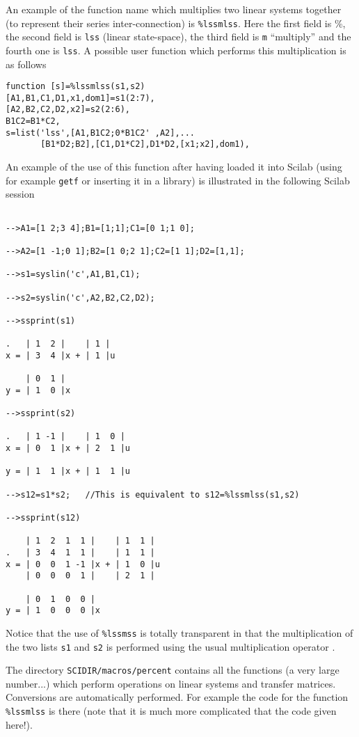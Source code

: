 	An example of the function name which multiplies two
linear systems together (to represent their series inter-connection)
is {\tt \%lssmlss}.  Here the first field is \%, the second field is 
{\tt lss} (linear state-space), the third field is {\tt m} ``multiply''
and the fourth one is {\tt lss}. A possible user function which performs
this multiplication is as follows
\begin{verbatim}
function [s]=%lssmlss(s1,s2)
[A1,B1,C1,D1,x1,dom1]=s1(2:7),
[A2,B2,C2,D2,x2]=s2(2:6),
B1C2=B1*C2,
s=list('lss',[A1,B1C2;0*B1C2' ,A2],...
       [B1*D2;B2],[C1,D1*C2],D1*D2,[x1;x2],dom1),
\end{verbatim}
An example of the use of this function after having loaded it into
Scilab (using for example {\tt getf} or inserting it in a library) 
is illustrated in the following Scilab session
\begin{verbatim}
 
-->A1=[1 2;3 4];B1=[1;1];C1=[0 1;1 0];
 
-->A2=[1 -1;0 1];B2=[1 0;2 1];C2=[1 1];D2=[1,1];
 
-->s1=syslin('c',A1,B1,C1);
 
-->s2=syslin('c',A2,B2,C2,D2);
 
-->ssprint(s1)
 
.   | 1  2 |    | 1 |    
x = | 3  4 |x + | 1 |u   
 
    | 0  1 |    
y = | 1  0 |x   
 
-->ssprint(s2)
 
.   | 1 -1 |    | 1  0 |    
x = | 0  1 |x + | 2  1 |u   
 
y = | 1  1 |x + | 1  1 |u   
 
-->s12=s1*s2;   //This is equivalent to s12=%lssmlss(s1,s2)
 
-->ssprint(s12)
 
    | 1  2  1  1 |    | 1  1 |    
.   | 3  4  1  1 |    | 1  1 |    
x = | 0  0  1 -1 |x + | 1  0 |u   
    | 0  0  0  1 |    | 2  1 |    
 
    | 0  1  0  0 |    
y = | 1  0  0  0 |x   
\end{verbatim}
Notice that the use of {\tt \%lssmss} is totally transparent in
that the multiplication of the two lists {\tt s1} and {\tt s2}
is performed using the usual multiplication operator {\tt *}.

The directory {\tt SCIDIR/macros/percent} contains all the functions
(a very large number...) which perform operations on linear systems
and transfer matrices. Conversions are automatically performed.
For example the code for the function {\tt \%lssmlss} is there (note
that it is much more complicated that the code given here!).
